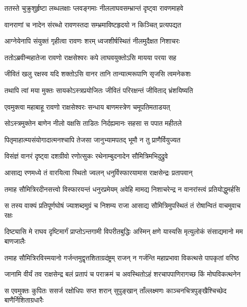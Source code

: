 \twolineshloka
{ततस्ते चुक्रुशुर्हृष्टा लब्धलक्षाः प्लवङ्गमाः}
{नीललाघवसम्भ्रान्तं दृष्ट्वा रावणमाहवे} %

\twolineshloka
{वानराणां च नादेन संरब्धो रावणस्तदा}
{सम्भ्रमाविष्टहृदयो न किञ्चित् प्रत्यपद्यत} %

\twolineshloka
{आग्नेयेनापि संयुक्तं गृहीत्वा रावणः शरम्}
{ध्वजशीर्षस्थितं नीलमुदैक्षत निशाचरः} %

\twolineshloka
{ततोऽब्रवीन्महातेजा रावणो राक्षसेश्वरः}
{कपे लाघवयुक्तोऽसि मायया परया सह} %

\twolineshloka
{जीवितं खलु रक्षस्व यदि शक्तोऽसि वानर}
{तानि तान्यात्मरूपाणि सृजसि त्वमनेकशः} %

\twolineshloka
{तथापि त्वां मया मुक्तः सायकोऽस्त्रप्रयोजितः}
{जीवितं परिरक्षन्तं जीविताद् भ्रंशयिष्यति} %

\twolineshloka
{एवमुक्त्वा महाबाहू रावणो राक्षसेश्वरः}
{सन्धाय बाणमस्त्रेण चमूपतिमताडयत्} %

\twolineshloka
{सोऽस्त्रमुक्तेन बाणेन नीलो वक्षसि ताडितः}
{निर्दह्यमानः सहसा स पपात महीतले} %

\twolineshloka
{पितृमाहात्म्यसंयोगादात्मनश्चापि तेजसा}
{जानुभ्यामपतद् भूमौ न तु प्राणैर्वियुज्यत} %

\twolineshloka
{विसंज्ञं वानरं दृष्ट्वा दशग्रीवो रणोत्सुकः}
{रथेनाम्बुदनादेन सौमित्रिमभिदुद्रुवे} %

\twolineshloka
{आसाद्य रणमध्ये तं वारयित्वा स्थितो ज्वलन्}
{धनुर्विस्फारयामास राक्षसेन्द्रः प्रतापवान्} %

\twolineshloka
{तमाह सौमित्रिरदीनसत्त्वो विस्फारयन्तं धनुरप्रमेयम्}
{अवेहि मामद्य निशाचरेन्द्र न वानरांस्त्वं प्रतियोद्धुमर्हसि} %

\twolineshloka
{स तस्य वाक्यं प्रतिपूर्णघोषं ज्याशब्दमुग्रं च निशम्य राजा}
{आसाद्य सौमित्रिमुपस्थितं तं रोषान्वितं वाचमुवाच रक्षः} %

\twolineshloka
{दिष्ट्यासि मे राघव दृष्टिमार्गं प्राप्तोऽन्तगामी विपरीतबुद्धिः}
{अस्मिन् क्षणे यास्यसि मृत्युलोकं संसाद्यमानो मम बाणजालैः} %

\twolineshloka
{तमाह सौमित्रिरविस्मयानो गर्जन्तमुद्वृत्तशिताग्रदंष्ट्रम्}
{राजन् न गर्जन्ति महाप्रभावा विकत्थसे पापकृतां वरिष्ठ} %

\twolineshloka
{जानामि वीर्यं तव राक्षसेन्द्र बलं प्रतापं च पराक्रमं च}
{अवस्थितोऽहं शरचापपाणिरागच्छ किं मोघविकत्थनेन} %

\twolineshloka
{स एवमुक्तः कुपितः ससर्ज रक्षोधिपः सप्त शरान् सुपुङ्खान्}
{ताँल्लक्ष्मणः काञ्चनचित्रपुङ्खैश्चिच्छेद बाणैर्निशिताग्रधारैः} %

